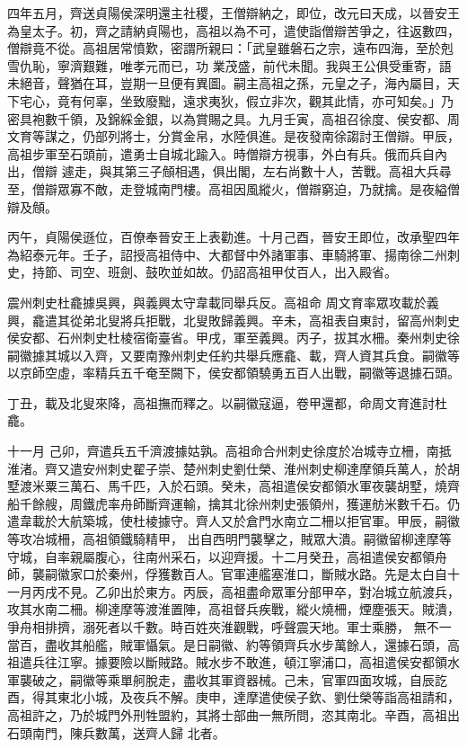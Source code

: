 \begin{pinyinscope}
 四年五月，齊送貞陽侯深明還主社稷，王僧辯納之，即位，改元曰天成，以晉安王為皇太子。初，齊之請納貞陽也，高祖以為不可，遣使詣僧辯苦爭之，往返數四，僧辯竟不從。高祖居常憤歎，密謂所親曰：「武皇雖磐石之宗，遠布四海，至於剋雪仇恥，寧濟艱難，唯孝元而已，功
 業茂盛，前代未聞。我與王公俱受重寄，語未絕音，聲猶在耳，豈期一旦便有異圖。嗣主高祖之孫，元皇之子，海內屬目，天下宅心，竟有何辜，坐致廢黜，遠求夷狄，假立非次，觀其此情，亦可知矣。」乃密具袍數千領，及錦綵金銀，以為賞賜之具。九月壬寅，高祖召徐度、侯安都、周文育等謀之，仍部列將士，分賞金帛，水陸俱進。是夜發南徐謅討王僧辯。甲辰，高祖步軍至石頭前，遣勇士自城北踰入。時僧辯方視事，外白有兵。俄而兵自內出，僧辯
 遽走，與其第三子頠相遇，俱出閣，左右尚數十人，苦戰。高祖大兵尋至，僧辯眾寡不敵，走登城南門樓。高祖因風縱火，僧辯窮迫，乃就擒。是夜縊僧辯及頠。



 丙午，貞陽侯遜位，百僚奉晉安王上表勸進。十月己酉，晉安王即位，改承聖四年為紹泰元年。壬子，詔授高祖侍中、大都督中外諸軍事、車騎將軍、揚南徐二州刺史，持節、司空、班劍、鼓吹並如故。仍詔高祖甲仗百人，出入殿省。



 震州刺史杜龕據吳興，與義興太守韋載同舉兵反。高祖命
 周文育率眾攻載於義興，龕遣其從弟北叟將兵拒戰，北叟敗歸義興。辛未，高祖表自東討，留高州刺史侯安都、石州刺史杜棱宿衛臺省。甲戌，軍至義興。丙子，拔其水柵。秦州刺史徐嗣徽據其城以入齊，又要南豫州刺史任約共舉兵應龕、載，齊人資其兵食。嗣徽等以京師空虛，率精兵五千奄至闕下，侯安都領驍勇五百人出戰，嗣徽等退據石頭。



 丁丑，載及北叟來降，高祖撫而釋之。以嗣徽寇逼，卷甲還都，命周文育進討杜龕。



 十一月
 己卯，齊遣兵五千濟渡據姑孰。高祖命合州刺史徐度於冶城寺立柵，南抵淮渚。齊又遣安州刺史翟子崇、楚州刺史劉仕榮、淮州刺史柳達摩領兵萬人，於胡墅渡米粟三萬石、馬千匹，入於石頭。癸未，高祖遣侯安都領水軍夜襲胡墅，燒齊船千餘艘，周鐵虎率舟師斷齊運輸，擒其北徐州刺史張領州，獲運舫米數千石。仍遣韋載於大航築城，使杜棱據守。齊人又於倉門水南立二柵以拒官軍。甲辰，嗣徽等攻冶城柵，高祖領鐵騎精甲，
 出自西明門襲擊之，賊眾大潰。嗣徽留柳達摩等守城，自率親屬腹心，往南州采石，以迎齊援。十二月癸丑，高祖遣侯安都領舟師，襲嗣徽家口於秦州，俘獲數百人。官軍連艦塞淮口，斷賊水路。先是太白自十一月丙戌不見。乙卯出於東方。丙辰，高祖盡命眾軍分部甲卒，對冶城立航渡兵，攻其水南二柵。柳達摩等渡淮置陣，高祖督兵疾戰，縱火燒柵，煙塵張天。賊潰，爭舟相排擠，溺死者以千數。時百姓夾淮觀戰，呼聲震天地。軍士乘勝，
 無不一當百，盡收其船艦，賊軍懾氣。是日嗣徽、約等領齊兵水步萬餘人，還據石頭，高祖遣兵往江寧。據要險以斷賊路。賊水步不敢進，頓江寧浦口，高祖遣侯安都領水軍襲破之，嗣徽等乘單舸脫走，盡收其軍資器械。己未，官軍四面攻城，自辰訖酉，得其東北小城，及夜兵不解。庚申，達摩遣使侯子欽、劉仕榮等詣高祖請和，高祖許之，乃於城門外刑牲盟約，其將士部曲一無所問，恣其南北。辛酉，高祖出石頭南門，陳兵數萬，送齊人歸
 北者。




\end{pinyinscope}
